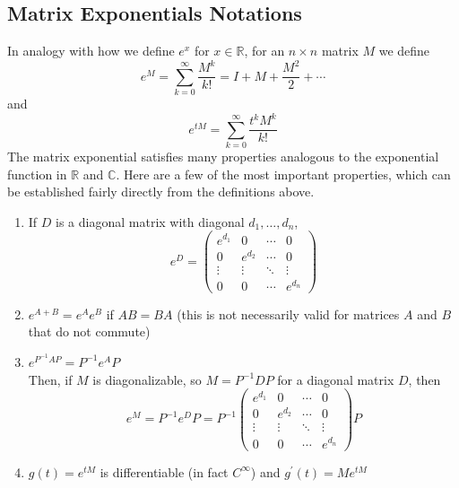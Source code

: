 \documentclass[11pt]{elegantbook}
\begin{document}
\subsection{Matrix Exponentials Notations}
In analogy with how we define $e^x$ for $x \in \mathbb{R}$, for an $n \times n$ matrix $M$ we define
$$
e^M=\sum_{k=0}^{\infty} \frac{M^k}{k !}=I+M+\frac{M^2}{2}+\cdots
$$
and
$$
e^{t M}=\sum_{k=0}^{\infty} \frac{t^k M^k}{k !}
$$
The matrix exponential satisfies many properties analogous to the exponential function in $\mathbb{R}$ and $\mathbb{C}$. Here are a few of the most important properties, which can be established fairly directly from the definitions above.
\begin{enumerate}[-]
    \item If $D$ is a diagonal matrix with diagonal $d_1, \ldots, d_n$,
    $$
    e^D=\left(\begin{array}{cccc}
    e^{d_1} & 0 & \cdots & 0 \\
    0 & e^{d_2} & \cdots & 0 \\
    \vdots & \vdots & \ddots & \vdots \\
    0 & 0 & \cdots & e^{d_n}
    \end{array}\right)
    $$
    \item $e^{A+B}=e^A e^B$ if $A B=B A$ (this is not necessarily valid for matrices $A$ and $B$ that do not commute)
    \item $e^{P^{-1} A P}=P^{-1} e^A P$\\
    Then, if $M$ is diagonalizable, so $M = P^{-1}DP$ for a diagonal matrix $D$, then $$e^M=P^{-1} e^D P=P^{-1} \left(\begin{array}{cccc}
        e^{d_1} & 0 & \cdots & 0 \\
        0 & e^{d_2} & \cdots & 0 \\
        \vdots & \vdots & \ddots & \vdots \\
        0 & 0 & \cdots & e^{d_n}
        \end{array}\right) P$$
    \item $g(t)=e^{t M}$ is differentiable (in fact $C^{\infty}$) and $g^{\prime}(t)=M e^{t M}$
\end{enumerate}
\end{document}
